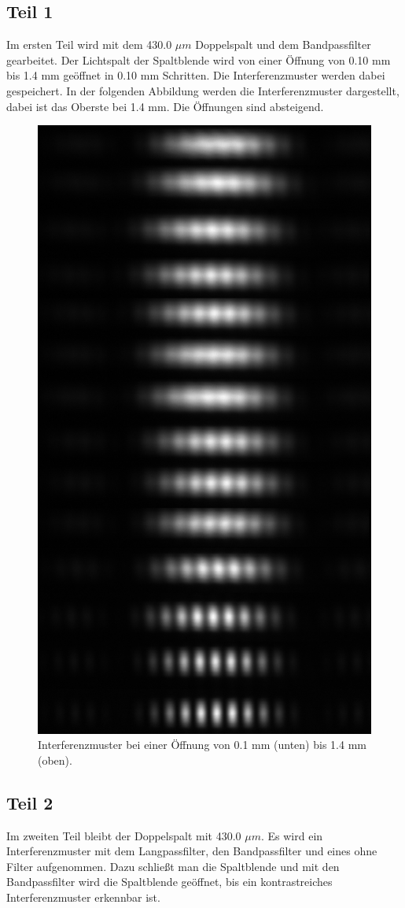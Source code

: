 \documentclass[12pt,a4paper,twoside]{article}
\begin{document}
\subsection{Teil 1}
Im ersten Teil wird mit dem 430.0 $\mu m$ Doppelspalt und dem Bandpassfilter gearbeitet. 
Der Lichtspalt der Spaltblende wird von einer Öffnung von 0.10 mm bis 1.4 mm geöffnet in 0.10 mm Schritten. Die Interferenzmuster werden dabei gespeichert. 
In der folgenden Abbildung werden die Interferenzmuster dargestellt, dabei ist das Oberste bei 1.4 mm. Die Öffnungen sind absteigend. 

\begin{figure}[H]
    \centering
    \includegraphics[width=0.6\linewidth]{nudes/aufgabe 1.jpg}
    \caption{Interferenzmuster bei einer Öffnung von 0.1 mm (unten) bis 1.4 mm (oben). }
    \label{fig:aufgabe 1}
\end{figure}

\subsection{Teil 2}
Im zweiten Teil bleibt der Doppelspalt mit 430.0 $\mu m$. Es wird ein Interferenzmuster mit dem Langpassfilter, den Bandpassfilter und eines ohne Filter aufgenommen. 
Dazu schließt man die Spaltblende und mit den Bandpassfilter wird die Spaltblende geöffnet, bis ein kontrastreiches Interferenzmuster erkennbar ist. 
\end{document}
